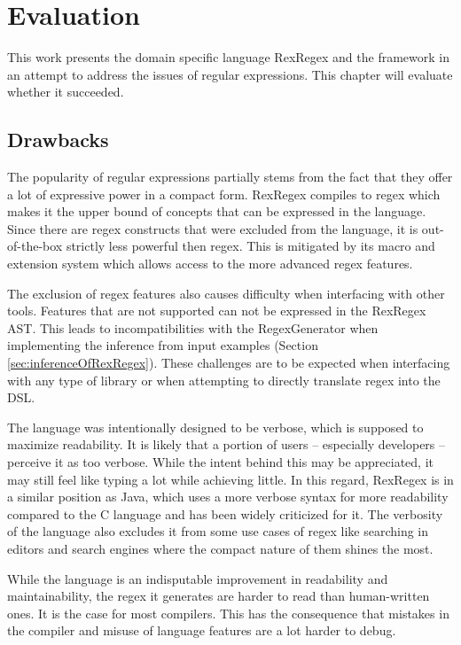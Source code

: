 \chapter{Evaluation}

This work presents the domain specific language RexRegex and the \utgast{} framework in an attempt to address the issues of regular expressions. This chapter will evaluate whether it succeeded.

\section{Drawbacks}

The popularity of regular expressions partially stems from the fact that they offer a lot of expressive power in a compact form. RexRegex compiles to regex which makes it the upper bound of concepts that can be expressed in the language. Since there are regex constructs that were excluded from the language, it is out-of-the-box strictly less powerful then regex. This is mitigated by its macro and extension system which allows access to the more advanced regex features.

The exclusion of regex features also causes difficulty when interfacing with other tools. Features that are not supported can not be expressed in the RexRegex AST. This leads to incompatibilities with the RegexGenerator \cite{bartoli2016inference} when implementing the inference from input examples (Section \ref{sec:inferenceOfRexRegex}). These challenges are to be expected when interfacing with any type of library or when attempting to directly translate regex into the DSL.

The language was intentionally designed to be verbose, which is supposed to maximize readability. It is likely that a portion of users -- especially developers -- perceive it as too verbose. While the intent behind this may be appreciated, it may still feel like typing a lot while achieving little. In this regard, RexRegex is in a similar position as Java, which uses a more verbose syntax for more readability compared to the C language and has been widely criticized for it. The verbosity of the language also excludes it from some use cases of regex like searching in editors and search engines where the compact nature of them shines the most.

While the language is an indisputable improvement in readability and maintainability, the regex it generates are harder to read than human-written ones. It is the case for most compilers. This has the consequence that mistakes in the compiler and misuse of language features are a lot harder to debug.

